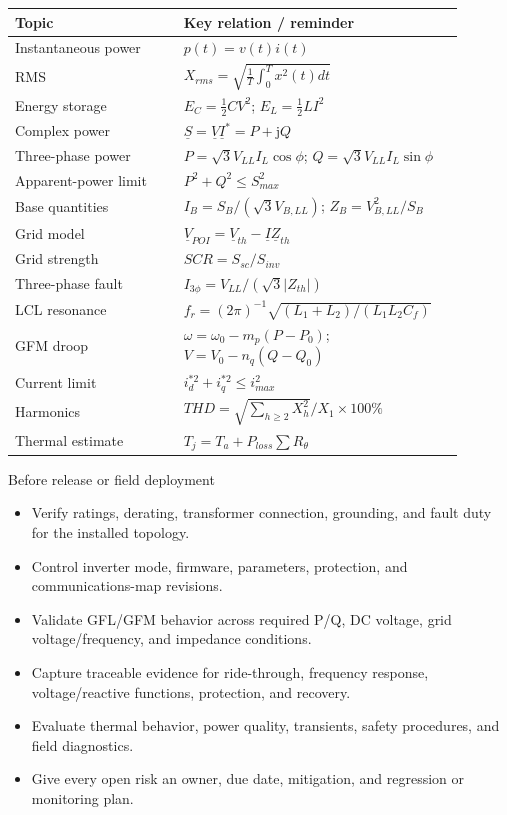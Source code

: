 \documentclass[11pt]{article}
\newcommand{\jop}{\mathrm{j}}
\begin{document}
\begin{longtable}{p{0.35\linewidth}p{0.54\linewidth}}
\toprule
Topic & Key relation / reminder \\
\midrule
Instantaneous power & $p(t)=v(t)i(t)$ \\
RMS & $X_{rms}=\sqrt{\frac1T\int_0^T x^2(t)dt}$ \\
Energy storage & $E_C=\frac12CV^2$; $E_L=\frac12LI^2$ \\
Complex power & $\underline S=\underline V\underline I^*=P+\jop Q$ \\
Three-phase power & $P=\sqrt3V_{LL}I_L\cos\phi$; $Q=\sqrt3V_{LL}I_L\sin\phi$ \\
Apparent-power limit & $P^2+Q^2\le S_{max}^2$ \\
Base quantities & $I_B=S_B/(\sqrt3V_{B,LL})$; $Z_B=V_{B,LL}^2/S_B$ \\
Grid model & $\underline V_{POI}=\underline V_{th}-\underline I\underline Z_{th}$ \\
Grid strength & $SCR=S_{sc}/S_{inv}$ \\
Three-phase fault & $I_{3\phi}=V_{LL}/(\sqrt3|Z_{th}|)$ \\
LCL resonance & $f_r=(2\pi)^{-1}\sqrt{(L_1+L_2)/(L_1L_2C_f)}$ \\
GFM droop & $\omega=\omega_0-m_p(P-P_0)$; $V=V_0-n_q(Q-Q_0)$ \\
Current limit & $i_d^{*2}+i_q^{*2}\le i_{max}^2$ \\
Harmonics & $THD=\sqrt{\sum_{h\ge2}X_h^2}/X_1\times100\%$ \\
Thermal estimate & $T_j=T_a+P_{loss}\sum R_\theta$ \\
\bottomrule
\end{longtable}

\begin{checklistbox}{Before release or field deployment}
\begin{itemize}
\item Verify ratings, derating, transformer connection, grounding, and fault duty for the installed topology.
\item Control inverter mode, firmware, parameters, protection, and communications-map revisions.
\item Validate GFL/GFM behavior across required P/Q, DC voltage, grid voltage/frequency, and impedance conditions.
\item Capture traceable evidence for ride-through, frequency response, voltage/reactive functions, protection, and recovery.
\item Evaluate thermal behavior, power quality, transients, safety procedures, and field diagnostics.
\item Give every open risk an owner, due date, mitigation, and regression or monitoring plan.
\end{itemize}
\end{checklistbox}
\end{document}
